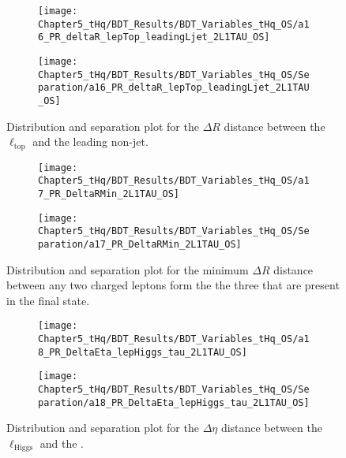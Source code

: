 \begin{figure}[h]
\centering
\begin{subfigure}{.45\textwidth}
  \centering
  \texttt{[image: Chapter5\_tHq/BDT\_Results/BDT\_Variables\_tHq\_OS/a16\_PR\_deltaR\_lepTop\_leadingLjet\_2L1TAU\_OS]}
\end{subfigure}%
\begin{subfigure}{.55\textwidth}
  \centering
  \texttt{[image: Chapter5\_tHq/BDT\_Results/BDT\_Variables\_tHq\_OS/Separation/a16\_PR\_deltaR\_lepTop\_leadingLjet\_2L1TAU\_OS]}
\end{subfigure}
\caption{Distribution and separation plot for the $\Delta R$ distance between the $\ell_{\text{top}}$ and
the leading non-\btagged jet.}
\label{fig:Appendix:BDTVARS:tHqOS:a16_PR_deltaR_lepTop_leadingLjet}
\end{figure}

\begin{figure}[h]
\centering
\begin{subfigure}{.45\textwidth}
  \centering
  \texttt{[image: Chapter5\_tHq/BDT\_Results/BDT\_Variables\_tHq\_OS/a17\_PR\_DeltaRMin\_2L1TAU\_OS]}
\end{subfigure}%
\begin{subfigure}{.55\textwidth}
  \centering
  \texttt{[image: Chapter5\_tHq/BDT\_Results/BDT\_Variables\_tHq\_OS/Separation/a17\_PR\_DeltaRMin\_2L1TAU\_OS]}
\end{subfigure}
\caption{Distribution and separation plot for the minimum $\Delta R$ distance between any two charged leptons form the 
the three that are present in the final state.}
\label{fig:Appendix:BDTVARS:tHqOS:a17_PR_DeltaRMin}
\end{figure}

\begin{figure}[h]
\centering
\begin{subfigure}{.45\textwidth}
  \centering
  \texttt{[image: Chapter5\_tHq/BDT\_Results/BDT\_Variables\_tHq\_OS/a18\_PR\_DeltaEta\_lepHiggs\_tau\_2L1TAU\_OS]}
\end{subfigure}%
\begin{subfigure}{.55\textwidth}
  \centering
  \texttt{[image: Chapter5\_tHq/BDT\_Results/BDT\_Variables\_tHq\_OS/Separation/a18\_PR\_DeltaEta\_lepHiggs\_tau\_2L1TAU\_OS]}
\end{subfigure}
\caption{Distribution and separation plot for the $\Delta \eta$ distance between the $\ell_{\text{Higgs}}$ and
the \tauhad.}
\label{fig:Appendix:BDTVARS:tHqOS:a18_PR_DeltaEta_lepHiggs_tau}
\end{figure}

